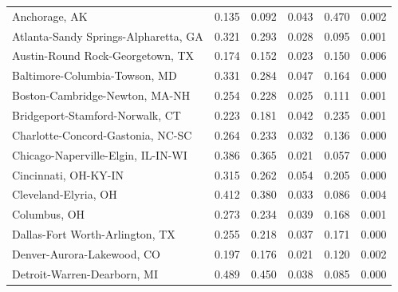 \begin{longtable}{lrrrrr}
\bottomrule
\endlastfoot
                               Anchorage, AK &              0.135 &              0.092 &                 0.043 &           0.470 &       0.002 \\
        Atlanta-Sandy Springs-Alpharetta, GA &              0.321 &              0.293 &                 0.028 &           0.095 &       0.001 \\
            Austin-Round Rock-Georgetown, TX &              0.174 &              0.152 &                 0.023 &           0.150 &       0.006 \\
               Baltimore-Columbia-Towson, MD &              0.331 &              0.284 &                 0.047 &           0.164 &       0.000 \\
              Boston-Cambridge-Newton, MA-NH &              0.254 &              0.228 &                 0.025 &           0.111 &       0.001 \\
             Bridgeport-Stamford-Norwalk, CT &              0.223 &              0.181 &                 0.042 &           0.235 &       0.001 \\
           Charlotte-Concord-Gastonia, NC-SC &              0.264 &              0.233 &                 0.032 &           0.136 &       0.000 \\
          Chicago-Naperville-Elgin, IL-IN-WI &              0.386 &              0.365 &                 0.021 &           0.057 &       0.000 \\
                        Cincinnati, OH-KY-IN &              0.315 &              0.262 &                 0.054 &           0.205 &       0.000 \\
                        Cleveland-Elyria, OH &              0.412 &              0.380 &                 0.033 &           0.086 &       0.004 \\
                                Columbus, OH &              0.273 &              0.234 &                 0.039 &           0.168 &       0.001 \\
             Dallas-Fort Worth-Arlington, TX &              0.255 &              0.218 &                 0.037 &           0.171 &       0.000 \\
                  Denver-Aurora-Lakewood, CO &              0.197 &              0.176 &                 0.021 &           0.120 &       0.002 \\
                 Detroit-Warren-Dearborn, MI &              0.489 &              0.450 &                 0.038 &           0.085 &       0.000 \\

\end{longtable}
